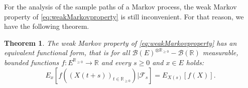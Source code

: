 \documentclass[12pt,a4paper]{scrartcl}
\newtheorem{theorem}{Theorem}[section]
\numberwithin{equation}{section}
\newcommand{\R}{\mathbb{R}} %
\begin{document}
For the analysis of the sample paths of a Markov process, the weak Markov property of \eqref{eq:weakMarkovproperty} is still inconvenient. For that reason, we have the following theorem.

\begin{theorem} \label{th:functionalWeakMarkovProperty}
The weak Markov property of \eqref{eq:weakMarkovproperty} has an equivalent functional form, that is for all $\mathcal{B}\left(E\right)^{\otimes \R_{\geq 0}}-\mathcal{B}\left(\R\right)$ measurable, bounded functions $f: E^{\R_{\geq 0}} \to \R$ and every $s\geq 0$ and $x \in E$ holds:
\begin{equation} \label{eq:functionalweakMarkovproperty}
E_x\left[f\left(\left(X\left(t+s\right)\right)_{t \in \R_{\geq 0}} \right) | \mathcal{F}_s \right] = E_{X\left(s\right)}\left[f\left(X\right) \right].
\end{equation}


\end{theorem}
\end{document}
